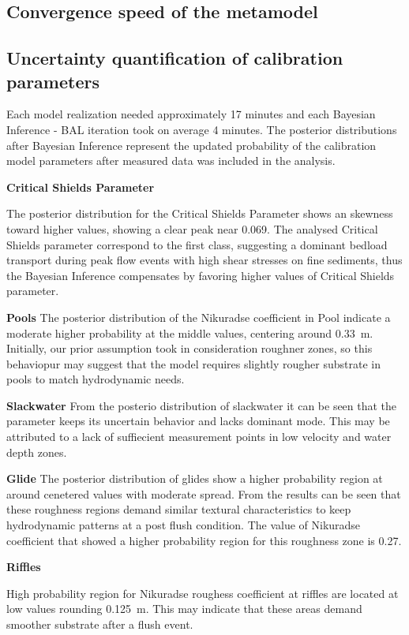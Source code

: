 \documentclass[draft,linenumbers,onecolumn]{agujournal2019} %
\begin{document}
\subsection{Convergence speed of the metamodel}


\subsection{Uncertainty quantification of calibration parameters}

Each model realization needed approximately 17 minutes and each Bayesian Inference - BAL iteration took on average 4 minutes. The posterior distributions after Bayesian Inference represent the updated probability of the calibration model parameters after measured data was included in the analysis.

\textbf{Critical Shields Parameter}

The posterior distribution for the Critical Shields Parameter shows an skewness toward higher values, showing a clear peak near 0.069. The analysed Critical Shields parameter correspond to the first class, suggesting a dominant bedload transport during peak flow events with high shear stresses  on fine sediments, thus the Bayesian Inference compensates by favoring higher values of Critical Shields parameter. 

\textbf{Pools}
The posterior distribution of the Nikuradse coefficient in Pool indicate a moderate higher probability at the middle values, centering around 0.33~m. Initially, our prior assumption took in consideration roughner zones, so this behaviopur may suggest that the model requires slightly rougher substrate in pools to match hydrodynamic needs.

\textbf{Slackwater}
From the posterio distribution of slackwater it can be seen that the parameter keeps its uncertain behavior and lacks dominant mode. This may be attributed to a lack of suffiecient measurement points in low velocity and water depth zones.

\textbf{Glide}
The posterior distribution of glides show a higher probability region at around cenetered values with moderate spread. From the results can be seen that these roughness regions demand similar textural characteristics to keep hydrodynamic patterns at a post flush condition. The value of Nikuradse coefficient that showed a higher probability region for this roughness zone is 0.27.

\textbf{Riffles}

High probability region for Nikuradse roughess coefficient at riffles are located at low values rounding 0.125~m. This may indicate that these areas demand smoother substrate after a flush event.
\end{document}
